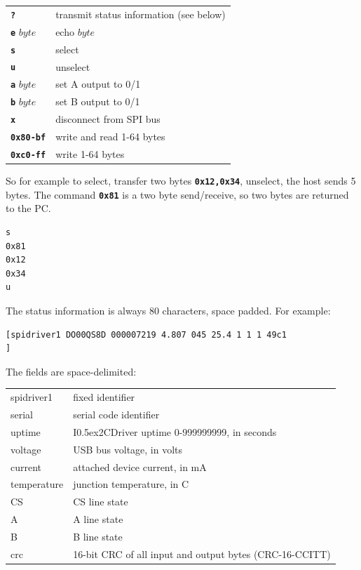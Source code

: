 \documentclass{article}
\newcommand{\two}{\raise0.5ex\hbox{\footnotesize{2}}}
\newcommand{\iicdriver}{I\two{}CDriver}
\newcommand{\mach}[1]{\texttt{\textbf{#1}}}
\newcommand{\gap}{\vspace{10pt}}
\begin{document}
\gap\begin{tabular}{ll}
\hline
\mach{?}        & transmit status information (see below)        \\
\mach{e} $byte$ & echo $byte$       \\
\mach{s}        & select        \\
\mach{u}        & unselect        \\
\mach{a} $byte$ & set A output to 0/1       \\
\mach{b} $byte$ & set B output to 0/1       \\
\mach{x}        & disconnect from SPI bus       \\
\mach{0x80-bf}  & write and read 1-64 bytes       \\
\mach{0xc0-ff}  & write 1-64 bytes        \\ \hline
\end{tabular}\gap

So for example to select, transfer two bytes
\mach{0x12,0x34},
unselect, the host sends 5 bytes.
The command \mach{0x81} is a two byte send/receive, so two bytes are returned to the PC.

\begin{lstlisting}
s
0x81
0x12
0x34
u
\end{lstlisting}


The status information is always 80 characters, space padded. For example:

{\scriptsize
\begin{framed}\begin{Verbatim}
[spidriver1 DO00QS8D 000007219 4.807 045 25.4 1 1 1 49c1                       ]
\end{Verbatim}
\end{framed}}

The fields are space-delimited:

\gap\begin{tabular}{ll}
\hline
spidriver1      & fixed identifier \\
serial          & serial code identifier \\
uptime          & \iicdriver{} uptime 0-999999999, in seconds \\
voltage         & USB bus voltage, in volts \\
current         & attached device current, in mA \\
temperature     & junction temperature, in C \\
CS              & CS line state \\
A               & A line state \\
B               & B line state \\
crc             & 16-bit CRC of all input and output bytes (CRC-16-CCITT) \\
\hline
\end{tabular}\gap
\end{document}
